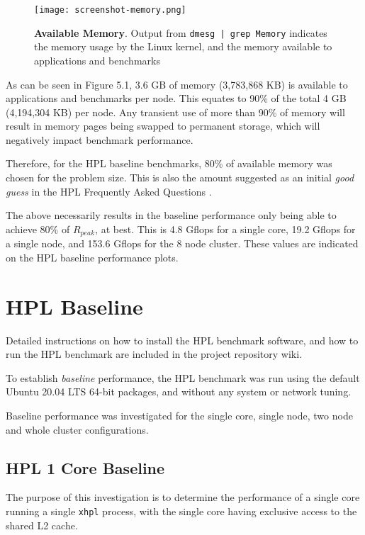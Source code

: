 \begin{figure}[h]
	\centering	
	\texttt{[image: screenshot-memory.png]}
	\caption{\textbf{Available Memory}. Output from \texttt{dmesg | grep Memory} indicates the memory usage by the Linux kernel, and the memory available to applications and benchmarks}
\end{figure}

As can be seen in Figure 5.1, 3.6 GB of memory (3,783,868 KB) is available to applications and benchmarks per node. This equates to 90\% of the total 4 GB (4,194,304 KB) per node. Any transient use of more than 90\% of memory will result in memory pages being swapped to permanent storage, which will negatively impact benchmark performance.

Therefore, for the HPL baseline benchmarks, 80\% of available memory was chosen for the problem size. This is also the amount suggested as an initial \emph{good guess} in the HPL Frequently Asked Questions \cite{hpl-faq}.

The above necessarily results in the baseline performance only being able to achieve 80\% of $R_{peak}$, at best. This is 4.8 Gflops for a single core, 19.2 Gflops for a single node, and 153.6 Gflops for the 8 node cluster. These values are indicated on the HPL baseline performance plots.


%
%
\section{HPL Baseline}

Detailed instructions on how to install the HPL benchmark software, and how to run the HPL benchmark are included in the project repository wiki.

To establish \emph{baseline} performance, the HPL benchmark was run using the default Ubuntu 20.04 LTS 64-bit packages, and without any system or network tuning.

Baseline performance was investigated for the single core, single node, two node and whole cluster configurations.


%
%
\subsection{HPL 1 Core Baseline}

The purpose of this investigation is to determine the performance of a single core running a single \verb|xhpl| process, with the single core having exclusive access to the shared L2 cache. 


